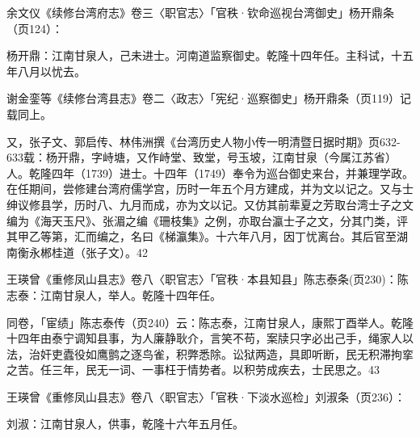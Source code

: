 \noindent 余文仪《续修台湾府志》卷三〈职官志〉「官秩·钦命巡视台湾御史」杨开鼎条（页124）：

\vfill
\begin{BookNotes}
\end{BookNotes}

杨开鼎：江南甘泉人，己未进士。河南道监察御史。乾隆十四年任。主科试，十五年八月以忧去。

谢金銮等《续修台湾县志》卷二〈政志〉「宪纪·巡察御史」杨开鼎条（页119）记载同上。

又，张子文、郭启传、林伟洲撰《台湾历史人物小传一明清暨日据时期》页632-633载：杨开鼎，字峙塘，又作峙堂、致堂，号玉坡，江南甘泉（今属江苏省）人。乾隆四年（1739）进士。十四年（1749）奉令为巡台御史来台，并兼理学政。在任期间，尝修建台湾府儒学宫，历时一年五个月方建成，并为文以记之。又与士绅议修县学，历时八、九月而成，亦为文以记。又仿其前辈夏之芳取台湾士子之文编为《海天玉尺》、张湄之编《珊枝集》之例，亦取台瀛士子之文，分其门类，评其甲乙等第，汇而编之，名曰《梯瀛集》。十六年八月，因丁忧离台。其后官至湖南衡永郴桂道（张子文）。42


\noindent 王瑛曾《重修凤山县志》卷八〈职官志〉「官秩·本县知县」陈志泰条(页230)：陈志泰：江南甘泉人，举人。乾隆十四年任。

同卷，「宦绩」陈志泰传（页240）云：陈志泰，江南甘泉人，康熙丁酉举人。乾隆十四年由泰宁调知县事，为人廉静耿介，言笑不苟，案牍只字必出己手，绳家人以法，治奸吏蠹役如鹰鹯之逐鸟雀，积弊悉除。讼狱两造，具即听断，民无积滞拘挛之苦。任三年，民无一词、一事枉于情势者。以积劳成疾去，士民思之。43

\vfill
\begin{BookNotes}
\end{BookNotes}


\noindent 王瑛曾《重修凤山县志》卷八〈职官志〉「官秩·下淡水巡检」刘淑条（页236）：

刘淑：江南甘泉人，供事，乾隆十六年五月任。


